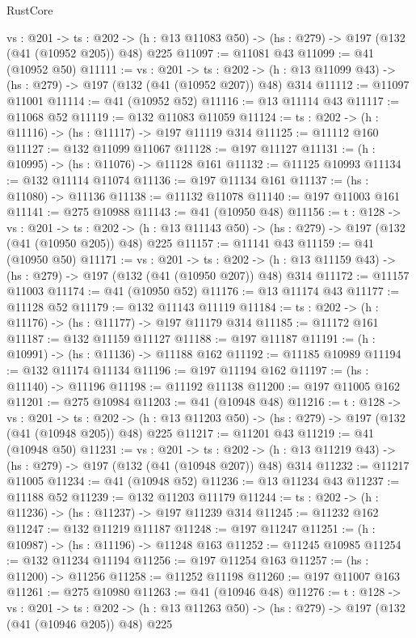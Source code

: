 \begin{lexlean}{RustCore}
\begin{coremodule}
  {vs : @201} ->
  {ts : @202} -> (h : @13 @11083 @50) -> (hs : @279) -> @197 (@132 (@41 (@10952 @205)) @48) @225
@11097 := @11081 @43
@11099 := @41 (@10952 @50)
@11111 := {vs : @201} ->
  {ts : @202} -> (h : @13 @11099 @43) -> (hs : @279) -> @197 (@132 (@41 (@10952 @207)) @48) @314
@11112 := @11097 @11001
@11114 := @41 (@10952 @52)
@11116 := @13 @11114 @43
@11117 := @11068 @52
@11119 := @132 @11083 @11059
@11124 := {ts : @202} -> (h : @11116) -> (hs : @11117) -> @197 @11119 @314
@11125 := @11112 @160
@11127 := @132 @11099 @11067
@11128 := @197 @11127
@11131 := (h : @10995) -> (hs : @11076) -> @11128 @161
@11132 := @11125 @10993
@11134 := @132 @11114 @11074
@11136 := @197 @11134 @161
@11137 := (hs : @11080) -> @11136
@11138 := @11132 @11078
@11140 := @197 @11003 @161
@11141 := @275 @10988
@11143 := @41 (@10950 @48)
@11156 := {t : @128} ->
  {vs : @201} ->
  {ts : @202} -> (h : @13 @11143 @50) -> (hs : @279) -> @197 (@132 (@41 (@10950 @205)) @48) @225
@11157 := @11141 @43
@11159 := @41 (@10950 @50)
@11171 := {vs : @201} ->
  {ts : @202} -> (h : @13 @11159 @43) -> (hs : @279) -> @197 (@132 (@41 (@10950 @207)) @48) @314
@11172 := @11157 @11003
@11174 := @41 (@10950 @52)
@11176 := @13 @11174 @43
@11177 := @11128 @52
@11179 := @132 @11143 @11119
@11184 := {ts : @202} -> (h : @11176) -> (hs : @11177) -> @197 @11179 @314
@11185 := @11172 @161
@11187 := @132 @11159 @11127
@11188 := @197 @11187
@11191 := (h : @10991) -> (hs : @11136) -> @11188 @162
@11192 := @11185 @10989
@11194 := @132 @11174 @11134
@11196 := @197 @11194 @162
@11197 := (hs : @11140) -> @11196
@11198 := @11192 @11138
@11200 := @197 @11005 @162
@11201 := @275 @10984
@11203 := @41 (@10948 @48)
@11216 := {t : @128} ->
  {vs : @201} ->
  {ts : @202} -> (h : @13 @11203 @50) -> (hs : @279) -> @197 (@132 (@41 (@10948 @205)) @48) @225
@11217 := @11201 @43
@11219 := @41 (@10948 @50)
@11231 := {vs : @201} ->
  {ts : @202} -> (h : @13 @11219 @43) -> (hs : @279) -> @197 (@132 (@41 (@10948 @207)) @48) @314
@11232 := @11217 @11005
@11234 := @41 (@10948 @52)
@11236 := @13 @11234 @43
@11237 := @11188 @52
@11239 := @132 @11203 @11179
@11244 := {ts : @202} -> (h : @11236) -> (hs : @11237) -> @197 @11239 @314
@11245 := @11232 @162
@11247 := @132 @11219 @11187
@11248 := @197 @11247
@11251 := (h : @10987) -> (hs : @11196) -> @11248 @163
@11252 := @11245 @10985
@11254 := @132 @11234 @11194
@11256 := @197 @11254 @163
@11257 := (hs : @11200) -> @11256
@11258 := @11252 @11198
@11260 := @197 @11007 @163
@11261 := @275 @10980
@11263 := @41 (@10946 @48)
@11276 := {t : @128} ->
  {vs : @201} ->
  {ts : @202} -> (h : @13 @11263 @50) -> (hs : @279) -> @197 (@132 (@41 (@10946 @205)) @48) @225

\end{coremodule}
\end{lexlean}
